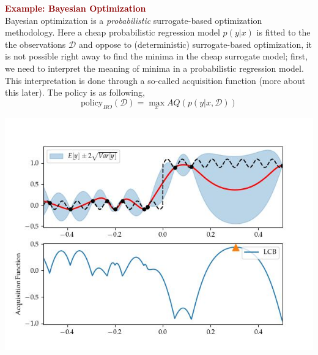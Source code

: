 \begin{tcolorbox}[
    sharp corners,
    boxrule=0mm,
    enhanced,
    borderline west={4pt}{-2pt}{darkred},
    borderline north={1pt}{0pt}{darkred},
    borderline south={1pt}{0pt}{darkred},
    borderline east={1pt}{0pt}{darkred},
    colframe=darkred!10,
    coltitle=darkred,
]
{ \textcolor{darkred}{\textbf{Example: Bayesian Optimization}}}\\
    Bayesian optimization is a \textit{probabilistic} surrogate-based optimization
    methodology. Here a cheap probabilistic regression model $p(y|x)$ is fitted to the
    the observations $\mathcal{D}$ and oppose to (deterministic) surrogate-based
    optimization, it is not possible right away to find the minima in the cheap
    surrogate model; first, we need to interpret the meaning of minima in a probabilistic
    regression model. This interpretation is done through a so-called acquisition
    function (more about this later). The policy is as following,
    $$\text{policy}_{BO}(\mathcal{D}) = \max_x AQ(p(y|x,\mathcal{D}))$$
    \begin{minipage}[t]{\textwidth}
        \vspace*{0pt}
            \includegraphics[width=\textwidth]{Pictures/SimonsTestGaussian Process - sklearn002.jpg}
            \label{fig:fig1}
        \end{minipage}
\end{tcolorbox}

